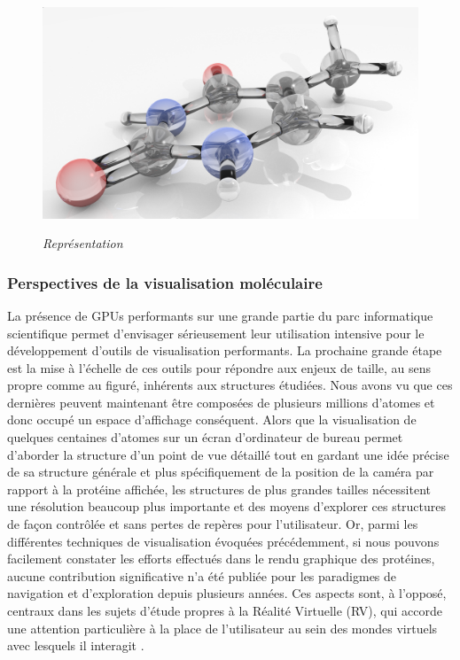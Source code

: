 \begin{figure}
  \centering
  {\includegraphics[width=.75\linewidth]{./figures/ch2/molecule_blender_glass}}
    \caption{{\it Représentation}}
  \label{Fig:molecule_blender_glass}
  \hspace{0.3cm}
\end{figure}


\subsubsection{Perspectives de la visualisation moléculaire}

La présence de GPUs performants sur une grande partie du parc informatique scientifique permet d'envisager sérieusement leur utilisation intensive pour le développement d'outils de visualisation performants. La prochaine grande étape est la mise à l'échelle de ces outils pour répondre aux enjeux de taille, au sens propre comme au figuré, inhérents aux structures étudiées. Nous avons vu que ces dernières peuvent maintenant être composées de plusieurs millions d'atomes et donc occupé un espace d'affichage conséquent. Alors que la visualisation de quelques centaines d'atomes sur un écran d'ordinateur de bureau permet d'aborder la structure d'un point de vue détaillé tout en gardant une idée précise de sa structure générale et plus spécifiquement de la position de la caméra par rapport à la protéine affichée, les structures de plus grandes tailles nécessitent une résolution beaucoup plus importante et des moyens d'explorer ces structures de façon contrôlée et sans pertes de repères pour l'utilisateur. Or, parmi les différentes techniques de visualisation évoquées précédemment, si nous pouvons facilement constater les efforts effectués dans le rendu graphique des protéines, aucune contribution significative n'a été publiée pour les paradigmes de navigation et d'exploration depuis plusieurs années. Ces aspects sont, à l'opposé, centraux dans les sujets d'étude propres à la Réalité Virtuelle (RV), qui accorde une attention particulière à la place de l'utilisateur au sein des mondes virtuels avec lesquels il interagit \cite{ortega_shocam_2015, khan_hovercam:_2005, he_virtual_1996}.


